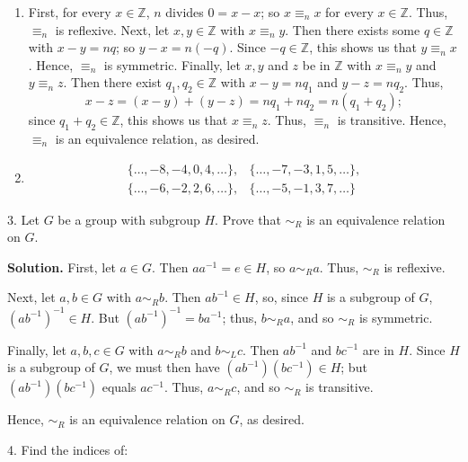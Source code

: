 \documentclass[10pt,]{book}
\theoremstyle{plain}
\theoremstyle{definition}
\theoremstyle{definition}
\theoremstyle{definition}
\theoremstyle{definition}
\numberwithin{equation}{section}
\def\Z{\mathbb{Z}}
\def\siml{\sim_L}
\def\simr{\sim_R}
\newcommand{\amp}{&}
\begin{document}
\begin{exerciselist}
\leavevmode%
\begin{enumerate}[label=(\alph*)]
\item\hypertarget{li-418}{}First, for every \(x \in \Z\), \(n\) divides \(0=x-x\); so \(x\equiv_n x\) for every \(x\in
\Z\).  Thus, \(\equiv_n\) is reflexive. Next, let \(x,y \in \Z\) with \(x\equiv_n y\).  Then there exists some \(q\in \Z\) with \(x-y=nq\); so \(y-x=n(-q)\). Since \(-q\in \Z\), this shows us that \(y\equiv_n x\).  Hence, \(\equiv_n\) is symmetric. Finally, let \(x,y\) and \(z\) be in \(\Z\) with \(x\equiv_n
y\) and \(y\equiv_nz\).  Then there exist \(q_1,q_2 \in \Z\) with \(x-y=nq_1\) and \(y-z=nq_2\).  Thus,%
\begin{equation*}
x-z=(x-y)+(y-z)=nq_1+nq_2=n(q_1+q_2);
\end{equation*}
since \(q_1+q_2 \in \Z\), this shows us that \(x\equiv_n z\).  Thus, \(\equiv_n\) is transitive. Hence, \(\equiv_n\) is an equivalence relation, as desired.%
\item\hypertarget{li-419}{}%
\begin{align*}
\{\ldots,-8,-4,0,4,\ldots\},\amp 
\{\ldots,-7,-3,1,5,\ldots\},\\
\{\ldots,-6,-2,2,6,\ldots\},\amp 
\{\ldots,-5,-1,3,7,\ldots\}
\end{align*}
%
\end{enumerate}
%
\item[3.]\hypertarget{exercise-52}{}Let \(G\) be a group with subgroup \(H\). Prove that \(\simr\) is an equivalence relation on \(G\).%
\par\smallskip
\par\smallskip
\noindent\textbf{Solution.}\hypertarget{solution-52}{}\quad
First, let \(a\in G\). Then \(aa^{-1}=e\in H\), so \(a\simr a\). Thus, \(\simr\) is reflexive.%
\par
Next, let \(a,b\in G\) with \(a\simr b\). Then \(ab^{-1}\in H\), so, since \(H\) is a subgroup of \(G\), \((ab^{-1})^{-1}\in H\). But \((ab^{-1})^{-1}=ba^{-1}\); thus, \(b\simr a\), and so \(\simr\) is symmetric.%
\par
Finally, let \(a,b,c\in G\) with \(a\simr b\) and \(b\siml c\). Then \(ab^{-1}\) and \(bc^{-1}\) are in \(H\). Since \(H\) is a subgroup of \(G\), we must then have \((ab^{-1})(bc^{-1})\in H\); but \((ab^{-1})(bc^{-1})\) equals \(ac^{-1}\). Thus, \(a\simr c\), and so \(\simr\) is transitive.%
\par
Hence, \(\simr\) is an equivalence relation on \(G\), as desired.%
\item[4.]\hypertarget{exercise-53}{}Find the indices of: \leavevmode%

\end{exerciselist}
\end{document}
